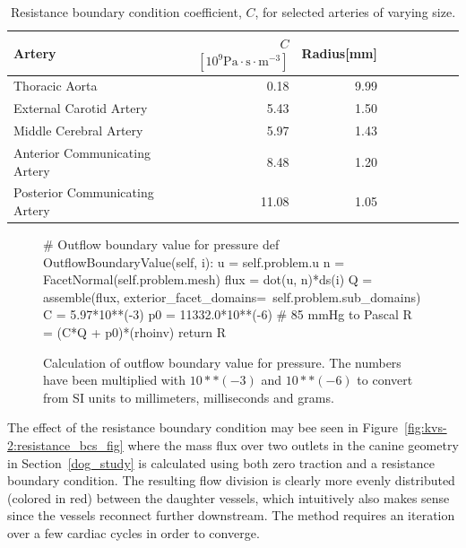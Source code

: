 \begin{table}
  \begin{center}
    \begin{tabular}{l*{7}{r}r}
      Artery & $C$ $ [10^9 \mathrm{Pa} \cdot \mathrm{s}  \cdot \mathrm{m}^{-3}]$ & Radius[mm]\\
      \hline
      Thoracic Aorta			&  0.18 &  	9.99\\
      External Carotid Artery  	& 5.43   &	1.50\\
      Middle Cerebral Artery  	& 5.97   &	1.43\\
      Anterior Communicating Artery  	& 8.48   &	1.20\\
      Posterior Communicating Artery  & 11.08   &	1.05\\
    \end{tabular}
  \end{center}
  \caption{Resistance boundary condition coefficient, $C$,
    for selected arteries of varying size.}
  \label{resistance_coeff}
\end{table}

\begin{figure}
  \begin{center}
    \begin{python}
# Outflow boundary value for pressure
def OutflowBoundaryValue(self, i):
    u = self.problem.u
    n = FacetNormal(self.problem.mesh)
    flux = dot(u, n)*ds(i)
    Q = assemble(flux,
                 exterior_facet_domains=\
                 self.problem.sub_domains)
    C = 5.97*10**(-3)
    p0 = 11332.0*10**(-6) # 85 mmHg to Pascal
    R = (C*Q + p0)*(rhoinv)
    return R

    \end{python}
    \caption{Calculation of outflow boundary value for pressure. The numbers have been multiplied with $10**(-3)$
and $10**(-6)$ to convert from SI units to millimeters, milliseconds and grams.}
    \label{fig:kvs-2:resistance_code}
  \end{center}
\end{figure}

The effect of the resistance boundary condition may bee seen in
Figure~\ref{fig:kvs-2:resistance_bcs_fig} where the mass flux over two
outlets in the canine geometry in Section~\ref{dog_study} is
calculated using both zero traction and a resistance boundary
condition. The resulting flow division is clearly more evenly
distributed (colored in red) between the daughter vessels, which
intuitively also makes sense since the vessels reconnect further
downstream. The method requires an iteration over a few cardiac cycles
in order to converge.

